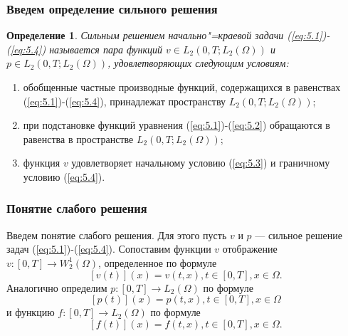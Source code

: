 \documentclass[10pt, pdf, hyperref={unicode}]{beamer}
\newtheorem{ru_def}{Определение}
\renewenvironment{definition}{\begin{ru_def}}{\end{ru_def}}
\begin{document}
  \begin{frame}
    \frametitle{Введем определение сильного решения}
    \begin{center}
      \begin{minipage}[h]{0.97\linewidth}
        \begin{definition}
          Сильным решением начально"=краевой задачи (\ref{eq:5.1})-(\ref{eq:5.4})
          называется пара функций $v\in L_2(0, T; L_2(\Omega))$ и
          $p\in L_2(0, T; L_2(\Omega))$, удовлетворяющих следующим условиям:
        \end{definition}
        \begin{enumerate} 
          \item обобщенные частные производные функций, содержащихся в равенствах
          (\ref{eq:5.1})-(\ref{eq:5.4}), принадлежат пространству $L_2(0, T; L_2(\Omega))$;
          \item при подстановке функций уравнения (\ref{eq:5.1})-(\ref{eq:5.2})
          обращаются в равенства в пространстве $L_2(0, T; L_2(\Omega))$;
          \item функция $v$ удовлетворяет начальному условию (\ref{eq:5.3}) и граничному условию (\ref{eq:5.4}).
        \end{enumerate}
      \end{minipage}
    \end{center}
  \end{frame}

  \begin{frame}
    \frametitle{Понятие слабого решения}
    \begin{center}
      \begin{minipage}[h]{0.97\linewidth}
        Введем понятие слабого решения. Для этого пусть $v$ и $p$ --- сильное решение задач (\ref{eq:5.1})-(\ref{eq:5.4}).
        Сопоставим функции $v$ отображение $v:[0, T]\rightarrow W^1_2(\Omega)$,
        определенное по формуле $$[v(t)](x)=v(t, x), t\in[0, T], x\in\Omega.$$
        Аналогично определим $p:[0, T]\rightarrow L_2(\Omega)$ по формуле $$[p(t)](x)=p(t, x), t\in[0, T], x\in\Omega$$
        и функцию $f:[0, T]\rightarrow L_2(\Omega)$ по формуле $$[f(t)](x)=f(t, x), t\in[0, T], x\in\Omega.$$
      \end{minipage}
    \end{center}
  \end{frame}
\end{document}
